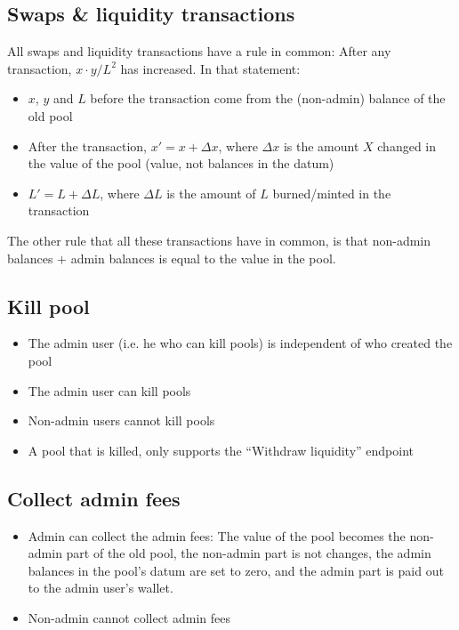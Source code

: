 \documentclass{article}
\begin{document}
\subsection*{Swaps \& liquidity transactions}

All swaps and liquidity transactions have a rule in common: After any
transaction, $x \cdot y / L^2$ has increased. In that statement:
\begin{itemize}
  \item $x$, $y$ and $L$ before the transaction come from the (non-admin)
    balance of the old pool
  \item After the transaction, $x' = x + \Delta x$, where $\Delta x$ is the
    amount $X$ changed in the value of the pool (value, not balances in the
    datum)
  \item $L' = L + \Delta L$, where $\Delta L$ is the amount of $L$ burned/minted
    in the transaction
\end{itemize}

The other rule that all these transactions have in common, is that non-admin
balances $+$ admin balances is equal to the value in the pool.

\subsection*{Kill pool}

\begin{itemize}
  \item The admin user (i.e. he who can kill pools) is independent of who
    created the pool
  \item The admin user can kill pools
  \item Non-admin users cannot kill pools
  \item A pool that is killed, only supports the ``Withdraw liquidity'' endpoint
\end{itemize}

\subsection*{Collect admin fees}

\begin{itemize}
  \item Admin can collect the admin fees: The value of the pool becomes the
    non-admin part of the old pool, the non-admin part is not changes, the admin
    balances in the pool's datum are set to zero, and the admin part is paid out
    to the admin user's wallet.
  \item Non-admin cannot collect admin fees
\end{itemize}
\end{document}
